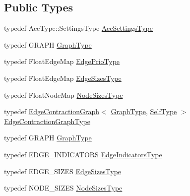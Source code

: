 \subsection*{Public Types}
\begin{DoxyCompactItemize}
\item 
typedef Acc\+Type\+::\+Settings\+Type \hyperlink{classnifty_1_1graph_1_1agglo_1_1LiftedGraphEdgeWeightedClusterPolicy_a988cf395d36cc7342860ae6b14977ae2}{Acc\+Settings\+Type}
\item 
typedef G\+R\+A\+PH \hyperlink{classnifty_1_1graph_1_1agglo_1_1LiftedGraphEdgeWeightedClusterPolicy_a09555efd4d9896f60e2225f905a6600c}{Graph\+Type}
\item 
typedef Float\+Edge\+Map \hyperlink{classnifty_1_1graph_1_1agglo_1_1LiftedGraphEdgeWeightedClusterPolicy_a7ef8d9cbb9ed15f40334501771c82ddb}{Edge\+Prio\+Type}
\item 
typedef Float\+Edge\+Map \hyperlink{classnifty_1_1graph_1_1agglo_1_1LiftedGraphEdgeWeightedClusterPolicy_ad544c54e73b2ce0be17ae1061dcec9ed}{Edge\+Sizes\+Type}
\item 
typedef Float\+Node\+Map \hyperlink{classnifty_1_1graph_1_1agglo_1_1LiftedGraphEdgeWeightedClusterPolicy_aec2d1f0ad4c63bb5847322c094a557cb}{Node\+Sizes\+Type}
\item 
typedef \hyperlink{classnifty_1_1graph_1_1EdgeContractionGraph}{Edge\+Contraction\+Graph}$<$ \hyperlink{classnifty_1_1graph_1_1agglo_1_1LiftedGraphEdgeWeightedClusterPolicy_a09555efd4d9896f60e2225f905a6600c}{Graph\+Type}, \hyperlink{classnifty_1_1graph_1_1agglo_1_1LiftedGraphEdgeWeightedClusterPolicy}{Self\+Type} $>$ \hyperlink{classnifty_1_1graph_1_1agglo_1_1LiftedGraphEdgeWeightedClusterPolicy_a20c8dc11217be76cda874a9ef9720e92}{Edge\+Contraction\+Graph\+Type}
\item 
typedef G\+R\+A\+PH \hyperlink{classnifty_1_1graph_1_1agglo_1_1LiftedGraphEdgeWeightedClusterPolicy_a09555efd4d9896f60e2225f905a6600c}{Graph\+Type}
\item 
typedef E\+D\+G\+E\+\_\+\+I\+N\+D\+I\+C\+A\+T\+O\+RS \hyperlink{classnifty_1_1graph_1_1agglo_1_1LiftedGraphEdgeWeightedClusterPolicy_ad402115dae3b01054a62b0573f84fcab}{Edge\+Indicators\+Type}
\item 
typedef E\+D\+G\+E\+\_\+\+S\+I\+Z\+ES \hyperlink{classnifty_1_1graph_1_1agglo_1_1LiftedGraphEdgeWeightedClusterPolicy_afe8f683c6cef1ab83446de02c40b3e54}{Edge\+Sizes\+Type}
\item 
typedef N\+O\+D\+E\+\_\+\+S\+I\+Z\+ES \hyperlink{classnifty_1_1graph_1_1agglo_1_1LiftedGraphEdgeWeightedClusterPolicy_a9fc3be4ac528987e8da19d55ef3b4285}{Node\+Sizes\+Type}

\end{DoxyCompactItemize}
